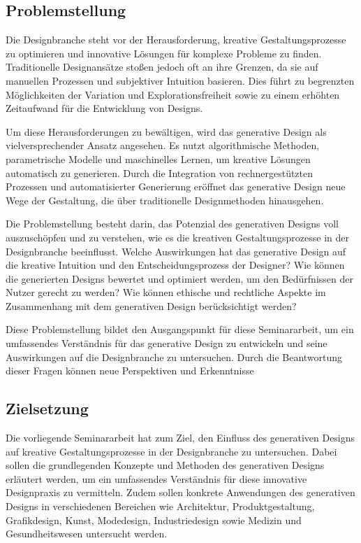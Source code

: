 \subsection*{Problemstellung}
Die Designbranche steht vor der Herausforderung, kreative Gestaltungsprozesse zu optimieren und innovative Lösungen für komplexe Probleme zu finden. Traditionelle Designansätze stoßen jedoch oft an ihre Grenzen, da sie auf manuellen Prozessen und subjektiver Intuition basieren. Dies führt zu begrenzten Möglichkeiten der Variation und Explorationsfreiheit sowie zu einem erhöhten Zeitaufwand für die Entwicklung von Designs.

Um diese Herausforderungen zu bewältigen, wird das generative Design als vielversprechender Ansatz angesehen. Es nutzt algorithmische Methoden, parametrische Modelle und maschinelles Lernen, um kreative Lösungen automatisch zu generieren. Durch die Integration von rechnergestützten Prozessen und automatisierter Generierung eröffnet das generative Design neue Wege der Gestaltung, die über traditionelle Designmethoden hinausgehen.

Die Problemstellung besteht darin, das Potenzial des generativen Designs voll auszuschöpfen und zu verstehen, wie es die kreativen Gestaltungsprozesse in der Designbranche beeinflusst. Welche Auswirkungen hat das generative Design auf die kreative Intuition und den Entscheidungsprozess der Designer? Wie können die generierten Designs bewertet und optimiert werden, um den Bedürfnissen der Nutzer gerecht zu werden? Wie können ethische und rechtliche Aspekte im Zusammenhang mit dem generativen Design berücksichtigt werden?

Diese Problemstellung bildet den Ausgangspunkt für diese Seminararbeit, um ein umfassendes Verständnis für das generative Design zu entwickeln und seine Auswirkungen auf die Designbranche zu untersuchen. Durch die Beantwortung dieser Fragen können neue Perspektiven und Erkenntnisse 


\subsection*{Zielsetzung}
Die vorliegende Seminararbeit hat zum Ziel, den Einfluss des generativen Designs auf kreative Gestaltungsprozesse in der Designbranche zu untersuchen. Dabei sollen die grundlegenden Konzepte und Methoden des generativen Designs erläutert werden, um ein umfassendes Verständnis für diese innovative Designpraxis zu vermitteln. Zudem sollen konkrete Anwendungen des generativen Designs in verschiedenen Bereichen wie Architektur, Produktgestaltung, Grafikdesign, Kunst, Modedesign, Industriedesign sowie Medizin und Gesundheitswesen untersucht werden. 

